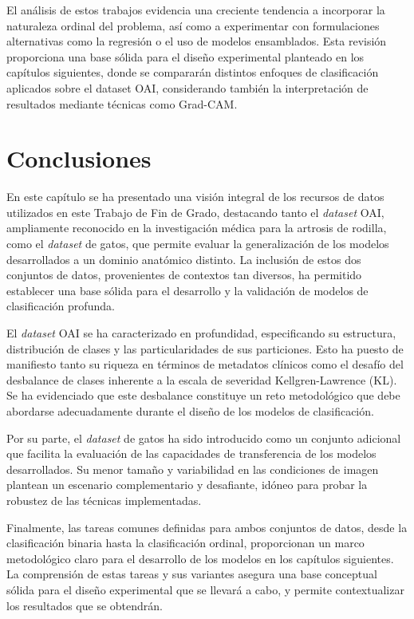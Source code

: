 \documentclass[11pt,spanish,listoffigures,listoftables]{tfgetsinf}
\begin{document}
El análisis de estos trabajos evidencia una creciente tendencia a incorporar la naturaleza ordinal del problema, así como a experimentar 
con formulaciones alternativas como la regresión o el uso de modelos ensamblados. Esta revisión proporciona una base sólida para el diseño 
experimental planteado en los capítulos siguientes, donde se compararán distintos enfoques de clasificación aplicados sobre el dataset OAI, 
considerando también la interpretación de resultados mediante técnicas como Grad-CAM.

\section{Conclusiones}
\label{sec:3_5_conclusiones}

En este capítulo se ha presentado una visión integral de los recursos de datos utilizados en este Trabajo de Fin de Grado, destacando tanto el \emph{dataset} OAI, ampliamente reconocido en la investigación médica para la artrosis de rodilla, como el \emph{dataset} de gatos, que permite evaluar la generalización de los modelos desarrollados a un dominio anatómico distinto. La inclusión de estos dos conjuntos de datos, provenientes de contextos tan diversos, ha permitido establecer una base sólida para el desarrollo y la validación de modelos de clasificación profunda.

El \emph{dataset} OAI se ha caracterizado en profundidad, especificando su estructura, distribución de clases y las particularidades de sus particiones. Esto ha puesto de manifiesto tanto su riqueza en términos de metadatos clínicos como el desafío del desbalance de clases inherente a la escala de severidad Kellgren-Lawrence (KL). Se ha evidenciado que este desbalance constituye un reto metodológico que debe abordarse adecuadamente durante el diseño de los modelos de clasificación.

Por su parte, el \emph{dataset} de gatos ha sido introducido como un conjunto adicional que facilita la evaluación de las capacidades de transferencia de los modelos desarrollados. Su menor tamaño y variabilidad en las condiciones de imagen plantean un escenario complementario y desafiante, idóneo para probar la robustez de las técnicas implementadas.

Finalmente, las tareas comunes definidas para ambos conjuntos de datos, desde la clasificación binaria hasta la clasificación ordinal, proporcionan un marco metodológico claro para el desarrollo de los modelos en los capítulos siguientes. La comprensión de estas tareas y sus variantes asegura una base conceptual sólida para el diseño experimental que se llevará a cabo, y permite contextualizar los resultados que se obtendrán.
\end{document}
